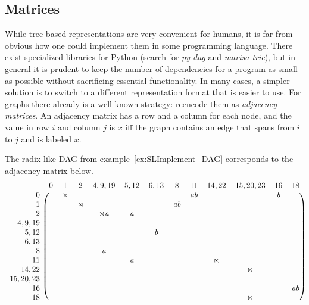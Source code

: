 \subsection{Matrices}

While tree-based representations are very convenient for humans, it is far from obvious how one could implement them in some programming language.
There exist specialized libraries for Python (search for \emph{py-dag} and \emph{marisa-trie}), but in general it is prudent to keep the number of dependencies for a program as small as possible without sacrificing essential functionality.
In many cases, a simpler solution is to switch to a different representation format that is easier to use.
For graphs there already is a well-known strategy: reencode them as \emph{adjacency matrices}.
An adjacency matrix has a row and a column for each node, and the value in row $i$ and column $j$ is $x$ iff the graph contains an edge that spans from $i$ to $j$ and is labeled $x$.
%
\begin{examplebox}
    The radix-like DAG from example~\ref{ex:SLImplement_DAG} corresponds to the adjacency matrix below.
    \label{ex:SLImplement_AdjacencyMatrix}
    {
    \small
        \[
        \begin{blockarray}{rcccccccccccc}
            & 0 & 1 & 2 & 4,9,19 & 5,12 & 6,13 & 8 & 11 & 14,22 & 15,20,23 & 16 & 18\\ 
            \begin{block}{r(cccccccccccc)}
                0 & & \LeftEdge & & & & & & \String{ab} & & & \String{b}\\
                1 & & & \LeftEdge & & & & \String{ab}\\
                2 & & & & \String{\LeftEdge a} & \String{a}\\
                4,9,19 & \\
                5,12 & & & & & & \String{b}\\
                6,13 & \\
                8 & & & & \String{a}\\
                11 & & & & & \String{a} & & & & \String{\RightEdge}\\
                14,22 & & & & & & & & & & \String{\RightEdge}\\
                15,20,23 & \\
                16 & & & & & & & & & & & & \String{ab}\\
                18 & & & & & & & & & & \String{\RightEdge}\\
            \end{block}
        \end{blockarray}
        \]
    }
\end{examplebox}
